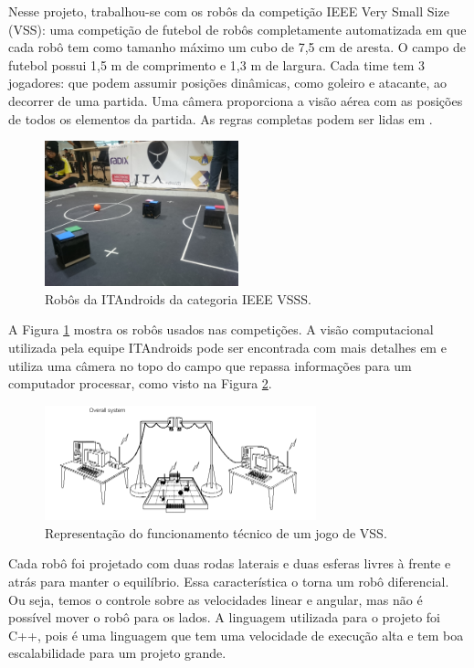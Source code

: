 \documentclass[conference]{IEEEtran}
\begin{document}
	Nesse projeto, trabalhou-se com os robôs da competição IEEE Very Small Size (VSS): uma competição de futebol de robôs completamente automatizada em que cada robô tem como tamanho máximo um cubo de 7,5 cm de aresta. O campo de futebol possui 1,5 m de comprimento e 1,3 m de largura. Cada time tem 3 jogadores: que podem assumir posições dinâmicas, como goleiro e atacante, ao decorrer de uma partida. Uma câmera proporciona a visão aérea com as posições de todos os elementos da partida. As regras completas podem ser lidas em \cite{CBR2008}.

\begin{figure}[H]
	\centering
	\includegraphics[width=0.5\textwidth]{figures/vss-min.JPG}
   \caption{Robôs da ITAndroids da categoria IEEE VSSS.} \label{fig:vss}
\end{figure}

	A Figura \ref{fig:vss} mostra os robôs usados nas competições. A visão computacional utilizada pela equipe ITAndroids pode ser encontrada com mais detalhes em \cite{zickler2009ssl} e utiliza uma câmera no topo do campo que repassa informações para um computador processar, como visto na Figura \ref{fig:funcioamento}.

\begin{figure}[H]
	\centering
		\includegraphics[width=0.7\textwidth]{figures/overview.png}
  \caption{Representação do funcionamento técnico de um jogo de VSS.}
	\label{fig:funcioamento}
\end{figure}

Cada robô foi projetado com duas rodas laterais e duas esferas livres à frente e atrás para manter o equilíbrio. Essa característica o torna um robô diferencial. Ou seja, temos o controle sobre as velocidades linear e angular, mas não é possível mover o robô para os lados. A linguagem utilizada para o projeto foi C++, pois é uma linguagem que tem uma velocidade de execução alta e tem boa escalabilidade para um projeto grande. 
\end{document}
